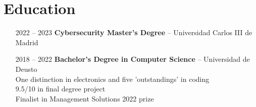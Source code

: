 \section*{Education}
\begin{itemize}
    \setlength\itemsep{0.3em}
    \item[2022 -- 2023] \textbf{Cybersecurity Master's Degree} -- Universidad Carlos III de Madrid
    \item[2018 -- 2022] \textbf{Bachelor's Degree in Computer Science} -- Universidad de Deusto\\
    One distinction in electronics and five 'outstandings' in coding\\
    9.5/10 in final degree project\\
    Finalist in Management Solutions 2022 prize
\end{itemize}

